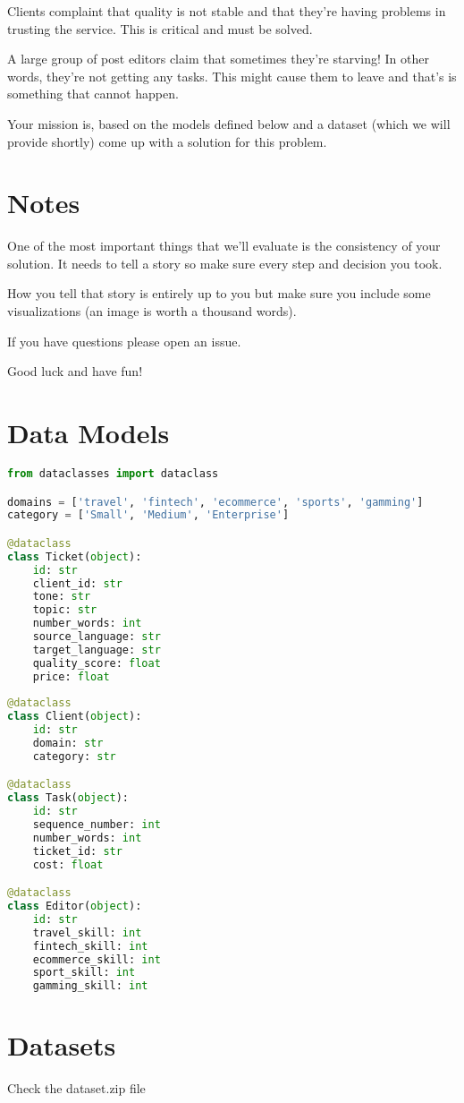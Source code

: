 \documentclass[]{extarticle}
\begin{document}
Clients complaint that quality is not stable and that they're having problems in trusting the service. This is critical and must be solved.

A large group of post editors claim that sometimes they're starving! In other words, they're not getting any tasks. This might cause them to leave and that's is something that cannot happen.

Your mission is, based on the models defined below and a dataset  (which we will provide shortly) come up with a solution for this problem.

\section{Notes}

One of the most important things that we'll evaluate is the consistency of your solution. It needs to tell a story so make sure every step and decision you took.

How you tell that story is entirely up to you but make sure you include some visualizations (an image is worth a thousand words).

If you have questions please open an issue.

Good luck and have fun!

\section{Data Models}

\begin{lstlisting}[language=Python]
from dataclasses import dataclass

domains = ['travel', 'fintech', 'ecommerce', 'sports', 'gamming']
category = ['Small', 'Medium', 'Enterprise']

@dataclass
class Ticket(object):
    id: str
    client_id: str
    tone: str
    topic: str
    number_words: int
    source_language: str
    target_language: str
    quality_score: float
    price: float
    
@dataclass
class Client(object):
    id: str
    domain: str
    category: str

@dataclass
class Task(object):
    id: str
    sequence_number: int
    number_words: int
    ticket_id: str
    cost: float

@dataclass
class Editor(object):
    id: str
    travel_skill: int
    fintech_skill: int
    ecommerce_skill: int
    sport_skill: int
    gamming_skill: int
\end{lstlisting}


\section{Datasets}

Check the dataset.zip file
\end{document}
